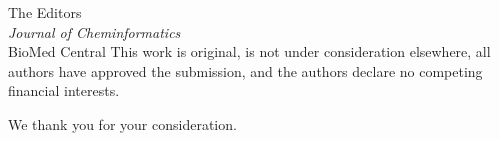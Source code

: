 \documentclass[11pt,a4paper]{letter}
\begin{document}
\begin{letter}{%
  The Editors \\
  \textit{Journal of Cheminformatics} \\
  BioMed Central
}
This work is original, is not under consideration elsewhere, all authors have approved the submission, and the authors declare no competing financial interests.

\closing{We thank you for your consideration.}



\end{letter}
\end{document}
